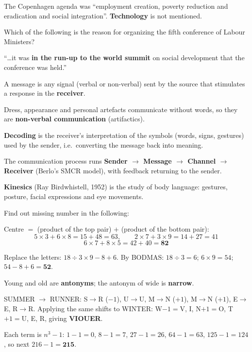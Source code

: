 The Copenhagen agenda was ``employment creation, poverty reduction and eradication and social integration''. \textbf{Technology} is not mentioned.

Which of the following is the reason for organizing the fifth conference of Labour Ministers?

``\ldots it was \textbf{in the run-up to the world summit} on social development that the conference was held.''

A message is any signal (verbal or non-verbal) sent by the source that stimulates a response in the \textbf{receiver}.

Dress, appearance and personal artefacts communicate without words, so they are \textbf{non-verbal communication} (artifactics).

\textbf{Decoding} is the receiver's interpretation of the symbols (words, signs, gestures) used by the sender, i.e.\ converting the message back into meaning.

The communication process runs \textbf{Sender $\rightarrow$ Message $\rightarrow$ Channel $\rightarrow$ Receiver} (Berlo's SMCR model), with feedback returning to the sender.

\textbf{Kinesics} (Ray Birdwhistell, 1952) is the study of body language: gestures, posture, facial expressions and eye movements.

\quad{}\quad{}

Find out missing number in the following:

Centre $=$ (product of the top pair) $+$ (product of the bottom pair):
\[5\times3+6\times8=15+48=63,\qquad 2\times7+3\times9=14+27=41\]
\[6\times7+8\times5=42+40=\mathbf{82}\]

Replace the letters: $18\div3\times9-8+6$.
By BODMAS: $18\div3=6$; $6\times9=54$; $54-8+6=\mathbf{52}$.

Young and old are \textbf{antonyms}; the antonym of wide is \textbf{narrow}.

SUMMER $\rightarrow$ RUNNER: S$\rightarrow$R ($-1$), U$\rightarrow$U, M$\rightarrow$N ($+1$), M$\rightarrow$N ($+1$), E$\rightarrow$E, R$\rightarrow$R.
Applying the same shifts to WINTER: W$-1=$V, I, N$+1=$O, T$+1=$U, E, R, giving \textbf{VIOUER}.

Each term is $n^3-1$: $1-1=0$, $8-1=7$, $27-1=26$, $64-1=63$, $125-1=124$, so next $216-1=\mathbf{215}$.

